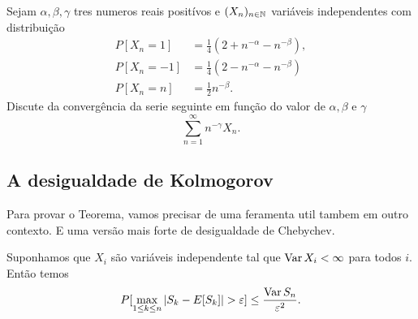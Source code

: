 \begin{topics}
\begin{exercise}
Sejam $\alpha, \beta, \gamma$ tres numeros reais positívos e $(X_n)_{n\in {\ensuremath{\mathbb N}}}$ variáveis independentes com distribuição
 \begin{equation} \begin{split}
 P[X_n=1]&=\frac{1}{4}\left(2+n^{-\alpha}-n^{-\beta}\right), \\
 P[X_n=-1]&=\frac{1}{4}\left(2-n^{-\alpha}-n^{-\beta}\right) \\
 P[X_n= n]&= \frac{1}{2} n^{-\beta}.
 \end{split}
\end{equation}
Discute da convergência da serie seguinte em função do valor de $\alpha, \beta$ e $\gamma$
\begin{equation}
 \sum_{n=1}^{\infty} n^{-\gamma} X_n.
\end{equation}




\end{exercise}

\subsection{A desigualdade de Kolmogorov}

Para provar o Teorema, vamos precisar de uma feramenta util tambem em outro contexto.
E uma versão mais forte de desigualdade de Chebychev.

\medskip


\begin{theorem}
Suponhamos que $X_i$ são variáveis independente tal que $\operatorname{Var} X_i<\infty$ para todos $i$.
Então temos
\begin{equation}
 P[\max_{1\le k\le n} |S_k-E[S_k]|>\gep ]\le  \frac{\Var S_n}{\gep^2}.
\end{equation}

\end{theorem}



\end{topics}
